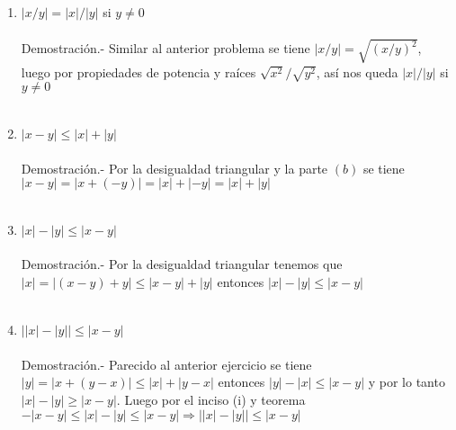 \begin{enumerate}
\begin{enumerate}[\bfseries (a)]
\item $|x/y|=|x|/|y|$ si $y \neq 0$\\\\
Demostración.- \; Similar al anterior problema se tiene $|x/y|=\sqrt{(x/y)^2}$, luego por propiedades de  potencia y raíces $\sqrt{x^2}/\sqrt{y^2}$, así nos queda $|x|/|y|$ si $y \neq 0$\\\\

\item $|x-y|\leq |x|+|y|$\\\\
Demostración.- \; Por la desigualdad triangular y la parte $(b)$ se tiene $|x-y| = |x+(-y)| = |x|+ |-y| = |x|+|y|$\\\\

\item $|x|-|y| \leq |x-y|$\\\\
Demostración.- \; Por la desigualdad triangular tenemos  que $|x|= |(x-y)+y| \leq |x-y|+|y|$ entonces $|x|-|y| \leq |x-y|$\\\\

\item $\left| |x| - |y| \right| \leq |x-y|$\\\\
Demostración.- \; Parecido al anterior ejercicio se tiene $|y|=|x+(y-x)| \leq |x|+|y-x|$ entonces $|y|-|x| \leq |x-y|$ y por lo tanto $|x|-|y|\geq |x-y|$. Luego por el inciso (i) y teorema $-|x-y|\leq |x|-|y| \leq |x-y| \Rightarrow \left||x|-|y|\right| \leq |x-y|$\\\\ 

\end{enumerate}


\end{enumerate}
